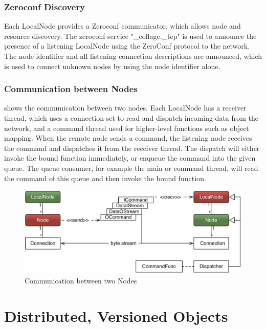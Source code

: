 \subsubsection{\label{sZeroconf}Zeroconf Discovery}

Each \textsf{LocalNode} provides a \textsf{Zeroconf} communicator, which allows
node and resource discovery. The zeroconf service "\_collage.\_tcp" is used to
announce the presence of a listening \textsf{LocalNode} using the ZeroConf
protocol to the network. The node identifier and all listening connection
descriptions are announced, which is used to connect unknown nodes by using the
node identifier alone.

\subsubsection{Communication between Nodes}

 shows the communication between two nodes. Each
\textsf{LocalNode} has a receiver thread, which uses a connection set to read
and dispatch incoming data from the network, and a command thread used for
higher-level functions such as object mapping. When the remote node sends a
command, the listening node receives the command and dispatches it from the
receiver thread. The dispatch will either invoke the bound function immediately,
or enqueue the command into the given queue. The queue consumer, for example the
main or command thread, will read the command of this queue and then invoke the
bound function.

\begin{figure}[h!t]\center
  \includegraphics[width=\textwidth]{images/netNode.pdf}
  {\caption{\label{fNetNode}Communication between two Nodes}}
\end{figure}

\section{Distributed, Versioned Objects}

